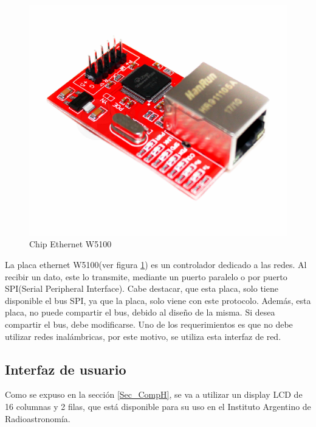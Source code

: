 \begin{figure}[ht]
	\centering	
	\includegraphics[scale=.2]{w5100}  
	\caption{Chip Ethernet W5100}		 
	\label{fig:chip_ethernet}
\end{figure}

La placa ethernet W5100(ver figura \ref{fig:chip_ethernet}) es un controlador dedicado a las redes. Al recibir un dato, este lo transmite, mediante un puerto paralelo o por puerto SPI(Serial Peripheral Interface). Cabe destacar, que esta placa, solo tiene disponible el bus SPI, ya que la placa, solo viene con este protocolo. Además, esta placa, no puede compartir el bus, debido al diseño de la misma. Si desea compartir el bus, debe modificarse. Uno de los requerimientos es que no debe utilizar redes inalámbricas, por este motivo, se utiliza esta interfaz de red. 

\subsection{Interfaz de usuario} \label{Int_u}
Como se expuso en la sección \ref{Sec_CompH}, se va a utilizar un display LCD de 16 columnas y 2 filas, que está disponible para su uso en el Instituto Argentino de Radioastronomía.  
 
